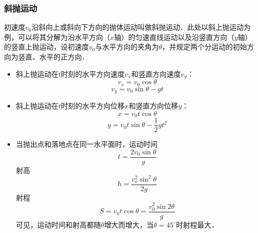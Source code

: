 \subsubsection{斜抛运动}

初速度$v_0$沿斜向上或斜向下方向的抛体运动叫做斜抛运动．此处以斜上抛运动为例，可以将其分解为沿水平方向（$x$轴）的匀速直线运动以及沿竖直方向（$y$轴）的竖直上抛运动，设初速度$v_0$与水平方向的夹角为$\theta$，并规定两个分运动的初始方向为竖直、水平的正方向．

\begin{itemize}
\item 斜上抛运动在$t$时刻的水平方向速度$v_x$和竖直方向速度$v_y$：
\begin{equation}
v_x=v_0\cos\theta
\end{equation}
\begin{equation}
v_y=v_0\sin\theta-gt
\end{equation}

\item 斜上抛运动在$t$时刻的水平方向位移$x$和竖直方向位移$y$：
\begin{equation}
x=v_0t\cos\theta
\end{equation}
\begin{equation}
y= v_0t\sin\theta-\frac12 gt^2
\end{equation}

\item 当抛出点和落地点在同一水平面时，运动时间
\begin{equation}
t=\frac{2v_0\sin\theta}{g}
\end{equation}
射高
\begin{equation}
h=\frac{v_o^2\sin^2\theta}{2g}
\end{equation}
射程
\begin{equation}
S=v_0t\cos\theta=\frac{v_0^2\sin{2\theta}}{g}
\end{equation}
可见，运动时间和射高都随$\theta$增大而增大，当$\theta=45^\circ$时射程最大．
\end{itemize}
